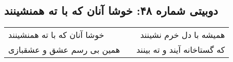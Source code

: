\begin{center}
\section*{دوبیتی شماره ۴۸: خوشا آنان که با ته همنشینند}
\label{sec:048}
\begin{longtable}{l p{0.5cm} r}
خوشا آنان که با ته همنشینند
&&
همیشه با دل خرم نشینند
\\
همین بی رسم عشق و عشقبازی
&&
که گستاخانه آیند و ته بینند
\\
\end{longtable}
\end{center}
